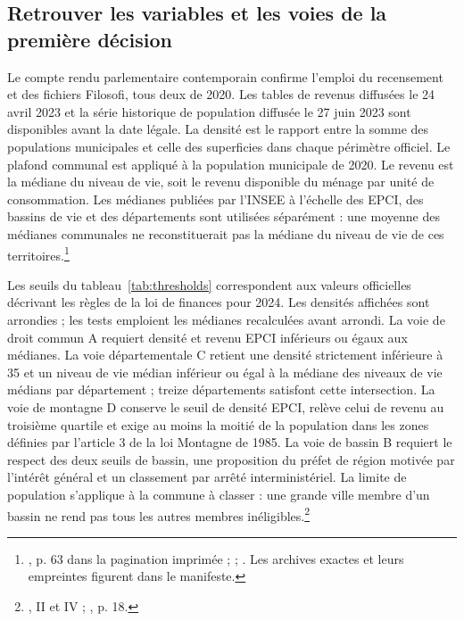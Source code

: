 \subsection{Retrouver les variables et les voies de la première décision}
Le compte rendu parlementaire contemporain confirme l’emploi du recensement et des fichiers Filosofi, tous deux de 2020. Les tables de revenus diffusées le 24 avril 2023 et la série historique de population diffusée le 27 juin 2023 sont disponibles avant la date légale. La densité est le rapport entre la somme des populations municipales et celle des superficies dans chaque périmètre officiel. Le plafond communal est appliqué à la population municipale de 2020. Le revenu est la médiane du niveau de vie, soit le revenu disponible du ménage par unité de consommation. Les médianes publiées par l’INSEE à l’échelle des EPCI, des bassins de vie et des départements sont utilisées séparément : une moyenne des médianes communales ne reconstituerait pas la médiane du niveau de vie de ces territoires.\footnote{, p. 63 dans la pagination imprimée ;  ; . Les archives exactes et leurs empreintes figurent dans le manifeste.}

Les seuils du tableau~\ref{tab:thresholds} correspondent aux valeurs officielles décrivant les règles de la loi de finances pour 2024. Les densités affichées sont arrondies ; les tests emploient les médianes recalculées avant arrondi. La voie de droit commun A requiert densité et revenu EPCI inférieurs ou égaux aux médianes. La voie départementale C retient une densité strictement inférieure à 35 et un niveau de vie médian inférieur ou égal à la médiane des niveaux de vie médians par département ; treize départements satisfont cette intersection. La voie de montagne D conserve le seuil de densité EPCI, relève celui de revenu au troisième quartile et exige au moins la moitié de la population dans les zones définies par l’article 3 de la loi Montagne de 1985. La voie de bassin B requiert le respect des deux seuils de bassin, une proposition du préfet de région motivée par l’intérêt général et un classement par arrêté interministériel. La limite de population s’applique à la commune à classer : une grande ville membre d’un bassin ne rend pas tous les autres membres inéligibles.\footnote{, II et IV ; , p. 18.}

